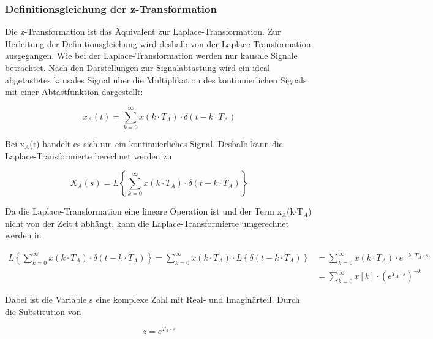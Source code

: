 \subsubsection{Definitionsgleichung der z-Transformation}

\noindent Die z-Transformation ist das \"{A}quivalent zur Laplace-Transformation. Zur Herleitung der Definitionsgleichung wird deshalb von der Laplace-Transformation ausgegangen. Wie bei der Laplace-Transformation werden nur kausale Signale betrachtet. Nach den Darstellungen zur Signalabtastung wird ein ideal abgetastetes kausales Signal \"{u}ber die Multiplikation des kontinuierlichen Signals mit einer Abtastfunktion dargestellt: 

\begin{equation}\label{eq:fiveone}
x_{A} \left(t\right)=\sum _{k=0}^{\infty }x\left(k\cdot T_{A} \right)\cdot \delta \left(t-k\cdot T_{A} \right) 
\end{equation}

\noindent Bei x${}_{A}$(t) handelt es sich um ein kontinuierliches Signal. Deshalb kann die Laplace-Transformierte berechnet werden zu 

\begin{equation}\label{eq:fivetwo}
X_{A} \left(s\right)=L\left\{\sum _{k=0}^{\infty }x\left(k\cdot T_{A} \right)\cdot \delta \left(t-k\cdot T_{A} \right) \right\}
\end{equation}

\noindent Da die Laplace-Transformation eine lineare Operation ist und der Term x$_{A}$(k$\cdot$T$_{A}$) nicht von der Zeit t abh\"{a}ngt, kann die Laplace-Transformierte umgerechnet werden in 

\begin{equation}\label{eq:fivethree}
\begin{split}
L\left\{\sum _{k=0}^{\infty }x(k\cdot T_{A} )\cdot \delta (t-k\cdot T_{A} ) \right\}=\sum _{k=0}^{\infty }x\left(k\cdot T_{A} \right)\cdot L\left\{\delta \left(t-k\cdot T_{A} \right)\right\} & =\sum _{k=0}^{\infty }x\left(k\cdot T_{A} \right)\cdot e^{-k\cdot T_{A} \cdot s} \\ 
& =\sum _{k=0}^{\infty }x\left[k\right]\cdot \left(e^{T_{A} \cdot s} \right)^{-k}
\end{split}
\end{equation}

\noindent Dabei ist die Variable s eine komplexe Zahl mit Real- und Imagin\"{a}rteil. Durch die Substitution von 

\begin{equation}\label{eq:fivefour}
z=e^{T_{A} \cdot s}
\end{equation}

